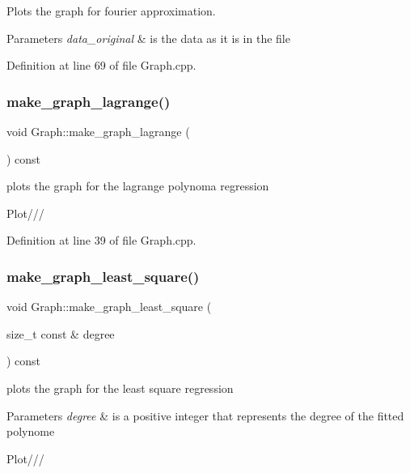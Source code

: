 Plots the graph for fourier approximation. 


\begin{DoxyParams}{Parameters}
{\em data\+\_\+original} & is the data as it is in the file \\
\hline
\end{DoxyParams}


Definition at line 69 of file Graph.\+cpp.

\mbox{\label{class_graph_a5fd01460d3981748a22269f9953d3486}} 
\subsubsection{\texorpdfstring{make\+\_\+graph\+\_\+lagrange()}{make\_graph\_lagrange()}}
{\footnotesize\ttfamily void Graph\+::make\+\_\+graph\+\_\+lagrange (\begin{DoxyParamCaption}{ }\end{DoxyParamCaption}) const}



plots the graph for the lagrange polynoma regression 

Plot/// 

Definition at line 39 of file Graph.\+cpp.

\mbox{\label{class_graph_af3560cb4e5eaa08c33e3de253a4e60a3}} 
\subsubsection{\texorpdfstring{make\+\_\+graph\+\_\+least\+\_\+square()}{make\_graph\_least\_square()}}
{\footnotesize\ttfamily void Graph\+::make\+\_\+graph\+\_\+least\+\_\+square (\begin{DoxyParamCaption}\item[{size\+\_\+t const \&}]{degree }\end{DoxyParamCaption}) const}



plots the graph for the least square regression 


\begin{DoxyParams}{Parameters}
{\em degree} & is a positive integer that represents the degree of the fitted polynome \\
\hline
\end{DoxyParams}
Plot/// 

